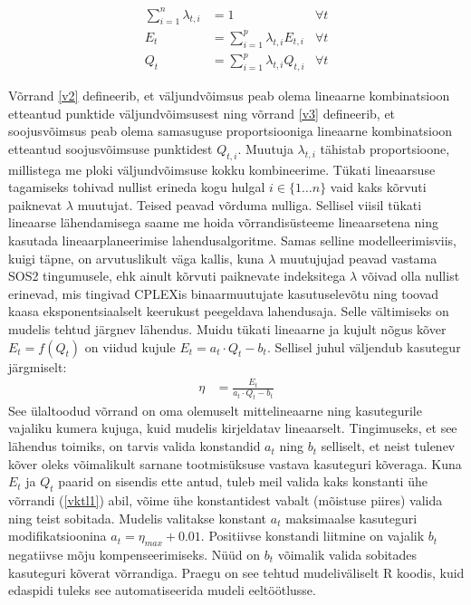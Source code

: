 \documentclass[10pt,a4paper]{article}
\begin{document}
\begin{align}
\sum_{i=1}^n \lambda_{t,i} &= 1 & \forall t \\
E_t &= \sum_{i=1}^p \lambda_{t,i} E_{t, i} & \forall t  \label{v2} \\
Q_t &= \sum_{i=1}^p \lambda_{t,i} Q_{t, i} & \forall t  \label{v3}
\end{align} 

Võrrand \eqref{v2} defineerib, et väljundvõimsus peab olema lineaarne kombinatsioon etteantud punktide väljundvõimsusest ning võrrand \eqref{v3} defineerib, et soojusvõimsus peab olema samasuguse proportsiooniga lineaarne kombinatsioon etteantud soojusvõimsuse punktidest $Q_{t,i}$. Muutuja $\lambda_{t,i}$ tähistab proportsioone, millistega me ploki väljundvõimsuse kokku kombineerime. Tükati lineaarsuse tagamiseks tohivad nullist erineda kogu hulgal $i \in \{1\dots n\}$ vaid kaks kõrvuti paiknevat $\lambda$ muutujat. Teised peavad võrduma nulliga. Sellisel viisil tükati lineaarse lähendamisega saame me hoida võrrandisüsteeme lineaarsetena ning kasutada lineaarplaneerimise lahendusalgoritme.
Samas selline modelleerimisviis, kuigi täpne, on arvutuslikult väga kallis, kuna $\lambda$ muutujujad peavad vastama SOS2 tingumusele, ehk ainult kõrvuti paiknevate indeksitega $\lambda$ võivad olla nullist erinevad, mis tingivad CPLEXis binaarmuutujate kasutuselevõtu ning toovad kaasa eksponentsiaalselt keerukust peegeldava lahendusaja. Selle vältimiseks on mudelis tehtud järgnev lähendus. Muidu tükati lineaarne ja kujult nõgus kõver $E_t = f(Q_t)$ on viidud kujule $E_t = a_t \cdot Q_t - b_t$. Sellisel juhul väljendub kasutegur järgmiselt:
\begin{align}
\eta &= \frac{E_t}{a_t \cdot Q_t - b_t} \label{vktl1}
\end{align}
See ülaltoodud võrrand on oma olemuselt mittelineaarne ning kasutegurile vajaliku kumera kujuga, kuid mudelis kirjeldatav lineaarselt. Tingimuseks, et see lähendus toimiks, on tarvis valida konstandid $a_t$ ning $b_t$ selliselt, et neist tulenev kõver oleks võimalikult sarnane tootmisüksuse vastava kasuteguri kõveraga. Kuna $E_t$ ja $Q_t$ paarid on sisendis ette antud, tuleb meil valida kaks konstanti ühe võrrandi (\ref{vktl1}) abil, võime ühe konstantidest vabalt (mõistuse piires) valida ning teist sobitada. Mudelis valitakse konstant $a_t$ maksimaalse kasuteguri modifikatsioonina $a_t = \eta_{max} + 0.01$. Positiivse konstandi liitmine on vajalik $b_t$ negatiivse mõju kompenseerimiseks.   Nüüd on $b_t$ võimalik valida sobitades kasuteguri kõverat võrrandiga. Praegu on see tehtud mudeliväliselt R koodis, kuid edaspidi tuleks see automatiseerida mudeli eeltöötlusse.
\end{document}
